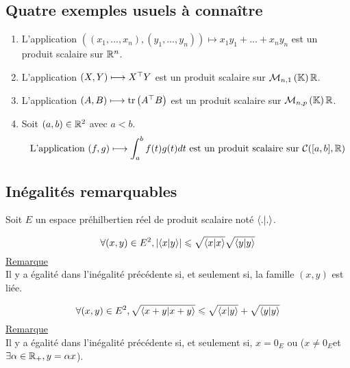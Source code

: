 \subsection{Quatre exemples usuels à connaître}
\begin{defprop}
    \begin{enumerate}
        \item L’application \(((x_1, \dots , x_n), (y_1, \dots , y_n)) \mapsto x_1y_1 + \dots + x_ny_n\) est un produit scalaire sur \(\mathbb{R}^n\).
        \item L’application \((X, Y ) \longmapsto X^{\top}Y\) est un produit scalaire sur \(\M{n,1}{\R}\).
        \item L’application \((A, B) \longmapsto \operatorname{tr} \left(A^{\top}B\right)\) est un produit scalaire sur \(\M{n,p}{\R}\).
        \item Soit \((a, b) \in \mathbb{R}^2\) avec \(a < b\).
            \[ \text{ L’application }(f, g) \longmapsto \int^b_a f (t)g(t) dt \text{ est un produit scalaire sur } \mathcal{C}([a, b] , \mathbb{R})\]
    \end{enumerate}
\end{defprop}
\subsection{Inégalités remarquables}
Soit \(E\) un espace préhilbertien réel de produit scalaire noté \(\langle . | . \rangle\).
\begin{defprop}
    \[\forall (x, y) \in E^2, \left\lvert\langle x | y \rangle\right\rvert \leqslant \sqrt{\langle x | x \rangle}\sqrt{\langle y | y \rangle}\]
    \underline{Remarque}\\
    Il y a égalité dans l’inégalité précédente si, et seulement si, la famille \((x, y)\) est liée.
\end{defprop}
\begin{defprop}
    \[\forall (x, y) \in E^2, \sqrt{\langle x + y | x+y \rangle} \leqslant \sqrt{\langle x | y \rangle} + \sqrt{\langle y | y \rangle}\]
    \underline{Remarque}\\
    Il y a égalité dans l’inégalité précédente si, et seulement si, \(x = 0_E\) ou (\(x\neq 0_E \)et \(\exists \alpha \in \mathbb{R}_+, y = \alpha x\)).
\end{defprop}
